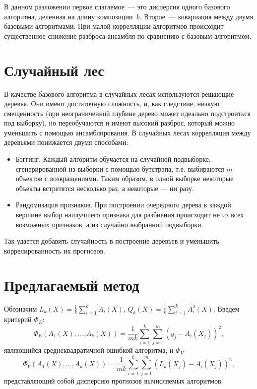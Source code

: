 \documentclass{article}
\begin{document}
В данном разложении первое слагаемое~--- это дисперсия одного базового алгоритма,
деленная на длину композиции~$k$.
Второе~--- ковариация между двумя базовыми алгоритмами.
При малой коррелляции алгоритмов происходит существенное снижение разброса ансамбля по сравнению с базовым алгоритмом.

\section{Случайный лес} \label{sec:random_forest}
В качестве базового алгоритма в случайных лесах используются решающие деревья. Они имеют достаточную сложность, и, как следствие, низкую смещенность (при неограниченной глубине дерево может идеально подстроиться под выборку), но переобучаются и имеют высокий разброс, который можно уменьшить с помощью ансамблирования. В случайных лесах коррелляция между деревьями понижается двумя способами:
\begin{itemize}
  \item Бэггинг. Каждый алгоритм обучается на случайной подвыборке, сгенерированной из выборки с помощью бутстрэпа, т.е. выбираются $m$ объектов с возвращениями. Таким образом, в одной выборке некоторые объекты встретятся несколько раз, а некоторые — ни разу.
  \item Рандомизация признаков. При построении очередного дерева в каждой вершине выбор наилучшего признака для разбиения происходит не из всех возможных признаков, а из случайно выбранной подвыборки. 
\end{itemize}
Так удается добавить случайность в построение деревьев и уменьшить коррелированность их прогнозов.

\section{Предлагаемый метод}

Обозначим $L_k(X) = \frac{1}{k}\sum_{i = 1}^{k} A_i(X)$, $Q_k(X) = \frac{1}{k}\sum_{i = 1}^{k} A_i^2(X)$. Введем критерий $\Phi_E$:
\begin{equation*}
  \Phi_E(A_1(X), \dots, A_k(X)) = \frac{1}{mk} \sum_{i=1}^{k} \sum_{j=1}^{m} (y_j - A_i(X_j))^2,
\end{equation*}
являющийся среднеквадратичной ошибкой алгоритма, и $\Phi_V$
\begin{equation*}
  \Phi_V(A_1(X), \dots, A_k(X)) = \frac{1}{mk} \sum_{i=1}^{k} \sum_{j=1}^{m} (L_k(X_j) - A_i(X_j))^2,
\end{equation*}
представляющий собой дисперсию прогнозов вычисляемых алгоритмов.
\end{document}
